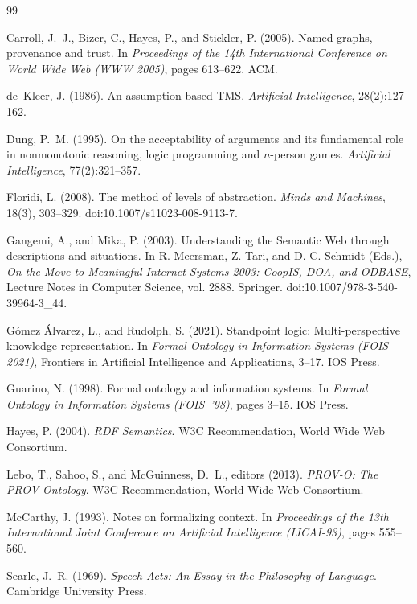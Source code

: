 \documentclass[11pt]{article}
\theoremstyle{plain}
\theoremstyle{definition}
\theoremstyle{remark}
\begin{document}
\begin{thebibliography}{99}

  Carroll, J.~J., Bizer, C., Hayes, P., and Stickler, P. (2005).
  Named graphs, provenance and trust.
  In \emph{Proceedings of the 14th International Conference on World Wide Web
    (WWW 2005)}, pages 613--622. ACM.

  de~Kleer, J. (1986).
  An assumption-based TMS.
  \emph{Artificial Intelligence}, 28(2):127--162.

  Dung, P.~M. (1995).
  On the acceptability of arguments and its fundamental role in nonmonotonic
  reasoning, logic programming and $n$-person games.
  \emph{Artificial Intelligence}, 77(2):321--357.

  Floridi, L. (2008).
  The method of levels of abstraction.
  \emph{Minds and Machines}, 18(3), 303--329.
  doi:10.1007/s11023-008-9113-7.

  Gangemi, A., and Mika, P. (2003).
  Understanding the Semantic Web through descriptions and situations.
  In R. Meersman, Z. Tari, and D. C. Schmidt (Eds.),
  \emph{On the Move to Meaningful Internet Systems 2003:
    CoopIS, DOA, and ODBASE},
  Lecture Notes in Computer Science, vol. 2888.
  Springer.
  doi:10.1007/978-3-540-39964-3\_44.

  G{\'o}mez {\'A}lvarez, L., and Rudolph, S. (2021).
  Standpoint logic: Multi-perspective knowledge representation.
  In \emph{Formal Ontology in Information Systems (FOIS 2021)},
  Frontiers in Artificial Intelligence and Applications, 3--17.
  IOS Press.

  Guarino, N. (1998).
  Formal ontology and information systems.
  In \emph{Formal Ontology in Information Systems (FOIS~'98)}, pages 3--15.
  IOS Press.

  Hayes, P. (2004).
  \emph{RDF Semantics}.
  W3C Recommendation, World Wide Web Consortium.

  Lebo, T., Sahoo, S., and McGuinness, D.~L., editors (2013).
  \emph{PROV-O: The PROV Ontology}.
  W3C Recommendation, World Wide Web Consortium.

  McCarthy, J. (1993).
  Notes on formalizing context.
  In \emph{Proceedings of the 13th International Joint Conference on Artificial
    Intelligence (IJCAI-93)}, pages 555--560.

  Searle, J.~R. (1969).
  \emph{Speech Acts: An Essay in the Philosophy of Language}.
  Cambridge University Press.

\end{thebibliography}
\end{document}
